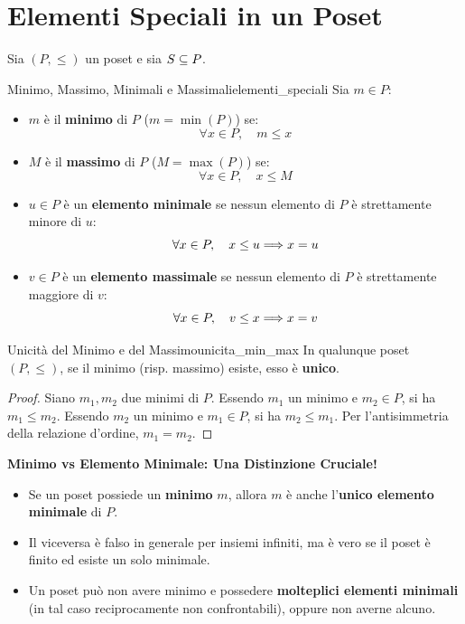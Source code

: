 \section{Elementi Speciali in un Poset}

Sia $(P, \le)$ un poset e sia $S \subseteq P$.

\begin{definizione}{Minimo, Massimo, Minimali e Massimali}{elementi_speciali}
Sia $m \in P$:
\begin{itemize}
    \item $m$ è il \textbf{minimo} di $P$ ($m = \min(P)$) se:
    \[
        \forall x \in P, \quad m \le x
    \]
    \item $M$ è il \textbf{massimo} di $P$ ($M = \max(P)$) se:
    \[
        \forall x \in P, \quad x \le M
    \]
    \item $u \in P$ è un \textbf{elemento minimale} se nessun elemento di $P$ è strettamente minore di $u$:
    \[
        \forall x \in P, \quad x \le u \Longrightarrow x = u
    \]
    \item $v \in P$ è un \textbf{elemento massimale} se nessun elemento di $P$ è strettamente maggiore di $v$:
    \[
        \forall x \in P, \quad v \le x \Longrightarrow x = v
    \]
\end{itemize}
\end{definizione}

\begin{proposizione}{Unicità del Minimo e del Massimo}{unicita_min_max}
In qualunque poset $(P, \le)$, se il minimo (risp. massimo) esiste, esso è \textbf{unico}.
\end{proposizione}
\begin{proof}
Siano $m_1, m_2$ due minimi di $P$. Essendo $m_1$ un minimo e $m_2 \in P$, si ha $m_1 \le m_2$. Essendo $m_2$ un minimo e $m_1 \in P$, si ha $m_2 \le m_1$. Per l'antisimmetria della relazione d'ordine, $m_1 = m_2$.
\end{proof}

\begin{avvisoCutolo}
    \textbf{Minimo vs Elemento Minimale: Una Distinzione Cruciale!}
    \begin{itemize}
        \item Se un poset possiede un \textbf{minimo} $m$, allora $m$ è anche l'\textbf{unico elemento minimale} di $P$.
        \item Il viceversa è falso in generale per insiemi infiniti, ma è vero se il poset è finito ed esiste un solo minimale.
        \item Un poset può non avere minimo e possedere \textbf{molteplici elementi minimali} (in tal caso reciprocamente non confrontabili), oppure non averne alcuno.
    \end{itemize}
\end{avvisoCutolo}

